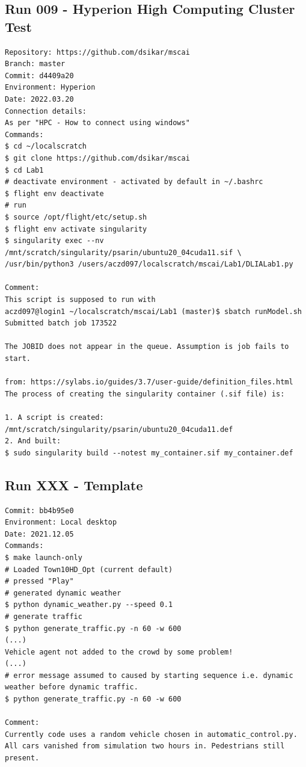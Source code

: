 \subsection{Run 009 - Hyperion High Computing Cluster Test}
\label{app_res:009}
\begin{verbatim}
Repository: https://github.com/dsikar/mscai
Branch: master
Commit: d4409a20
Environment: Hyperion
Date: 2022.03.20
Connection details:
As per "HPC - How to connect using windows"
Commands:
$ cd ~/localscratch 
$ git clone https://github.com/dsikar/mscai
$ cd Lab1
# deactivate environment - activated by default in ~/.bashrc
$ flight env deactivate
# run
$ source /opt/flight/etc/setup.sh
$ flight env activate singularity
$ singularity exec --nv /mnt/scratch/singularity/psarin/ubuntu20_04cuda11.sif \  /usr/bin/python3 /users/aczd097/localscratch/mscai/Lab1/DLIALab1.py

Comment:
This script is supposed to run with 
aczd097@login1 ~/localscratch/mscai/Lab1 (master)$ sbatch runModel.sh
Submitted batch job 173522

The JOBID does not appear in the queue. Assumption is job fails to start.

from: https://sylabs.io/guides/3.7/user-guide/definition_files.html
The process of creating the singularity container (.sif file) is:

1. A script is created:
/mnt/scratch/singularity/psarin/ubuntu20_04cuda11.def
2. And built:
$ sudo singularity build --notest my_container.sif my_container.def

\end{verbatim}


\subsection{Run XXX - Template}
\label{app_res:XXX}
\begin{verbatim}
Commit: bb4b95e0
Environment: Local desktop
Date: 2021.12.05
Commands:
$ make launch-only
# Loaded Town10HD_Opt (current default)
# pressed "Play"
# generated dynamic weather
$ python dynamic_weather.py --speed 0.1
# generate traffic
$ python generate_traffic.py -n 60 -w 600
(...)
Vehicle agent not added to the crowd by some problem!
(...)
# error message assumed to caused by starting sequence i.e. dynamic weather before dynamic traffic.
$ python generate_traffic.py -n 60 -w 600

Comment:
Currently code uses a random vehicle chosen in automatic_control.py. All cars vanished from simulation two hours in. Pedestrians still present.
\end{verbatim}
